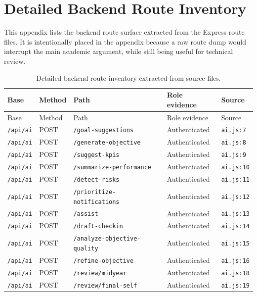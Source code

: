 \chapter{Detailed Backend Route Inventory}
This appendix lists the backend route surface extracted from the Express route files. It is intentionally placed in the appendix because a raw route dump would interrupt the main academic argument, while still being useful for technical review.

\begin{landscape}
\tiny
\setlength{\tabcolsep}{3pt}
\renewcommand{\arraystretch}{1.12}
\begin{longtable}{p{}p{}p{}p{}p{}}
\caption{Detailed backend route inventory extracted from source files.}\label{tab:detailed-routes}\\
\toprule
Base & Method & Path & Role evidence & Source\\
\midrule
\endfirsthead
\toprule
Base & Method & Path & Role evidence & Source\\
\midrule
\endhead
\texttt{/api/ai} & POST & \texttt{/goal-suggestions} & Authenticated & \texttt{ai.js:7}\\
\texttt{/api/ai} & POST & \texttt{/generate-objective} & Authenticated & \texttt{ai.js:8}\\
\texttt{/api/ai} & POST & \texttt{/suggest-kpis} & Authenticated & \texttt{ai.js:9}\\
\texttt{/api/ai} & POST & \texttt{/summarize-performance} & Authenticated & \texttt{ai.js:10}\\
\texttt{/api/ai} & POST & \texttt{/detect-risks} & Authenticated & \texttt{ai.js:11}\\
\texttt{/api/ai} & POST & \texttt{/prioritize-notifications} & Authenticated & \texttt{ai.js:12}\\
\texttt{/api/ai} & POST & \texttt{/assist} & Authenticated & \texttt{ai.js:13}\\
\texttt{/api/ai} & POST & \texttt{/draft-checkin} & Authenticated & \texttt{ai.js:14}\\
\texttt{/api/ai} & POST & \texttt{/analyze-objective-quality} & Authenticated & \texttt{ai.js:15}\\
\texttt{/api/ai} & POST & \texttt{/refine-objective} & Authenticated & \texttt{ai.js:16}\\
\texttt{/api/ai} & POST & \texttt{/review/midyear} & Authenticated & \texttt{ai.js:18}\\
\texttt{/api/ai} & POST & \texttt{/review/final-self} & Authenticated & \texttt{ai.js:19}\\

\end{longtable}
\end{landscape}
